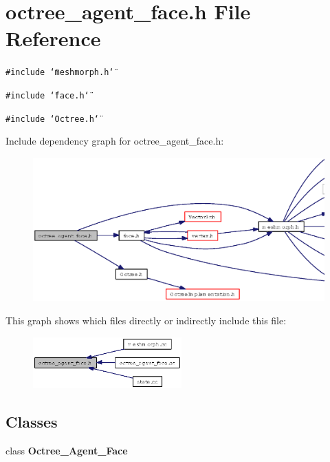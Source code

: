 \section{octree\_\-agent\_\-face.h File Reference}
\label{octree__agent__face_8h}
{\tt \#include \char`\"{}meshmorph.h\char`\"{}}\par
{\tt \#include \char`\"{}face.h\char`\"{}}\par
{\tt \#include \char`\"{}Octree.h\char`\"{}}\par


Include dependency graph for octree\_\-agent\_\-face.h:\begin{figure}[H]
\begin{center}
\leavevmode
\includegraphics[width=342pt]{octree__agent__face_8h__incl}
\end{center}
\end{figure}


This graph shows which files directly or indirectly include this file:\begin{figure}[H]
\begin{center}
\leavevmode
\includegraphics[width=162pt]{octree__agent__face_8h__dep__incl}
\end{center}
\end{figure}
\subsection*{Classes}
\begin{CompactItemize}
\item 
class {\bf Octree\_\-Agent\_\-Face}
\end{CompactItemize}
